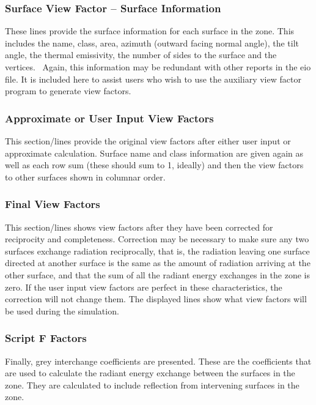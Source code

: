 \subsubsection{Surface View Factor -- Surface Information}\label{surface-view-factor-surface-information}

These lines provide the surface information for each surface in the zone. This includes the name, class, area, azimuth (outward facing normal angle), the tilt angle, the thermal emissivity, the number of sides to the surface and the vertices.~ Again, this information may be redundant with other reports in the eio file. It is included here to assist users who wish to use the auxiliary view factor program to generate view factors.

\subsubsection{Approximate or User Input View Factors}\label{approximate-or-user-input-view-factors}

This section/lines provide the original view factors after either user input or approximate calculation. Surface name and class information are given again as well as each row sum (these should sum to 1, ideally) and then the view factors to other surfaces shown in columnar order.

\subsubsection{Final View Factors}\label{final-view-factors}

This section/lines shows view factors after they have been corrected for reciprocity and completeness. Correction may be necessary to make sure any two surfaces exchange radiation reciprocally, that is, the radiation leaving one surface directed at another surface is the same as the amount of radiation arriving at the other surface, and that the sum of all the radiant energy exchanges in the zone is zero. If the user input view factors are perfect in these characteristics, the correction will not change them. The displayed lines show what view factors will be used during the simulation.

\subsubsection{Script F Factors}\label{script-f-factors}

Finally, grey interchange coefficients are presented. These are the coefficients that are used to calculate the radiant energy exchange between the surfaces in the zone. They are calculated to include reflection from intervening surfaces in the zone.

